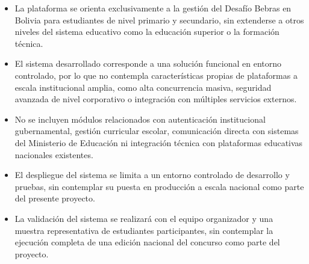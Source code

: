     \begin{itemize}
        \item La plataforma se orienta exclusivamente a la gestión del Desafío Bebras en Bolivia para estudiantes de nivel primario y secundario, sin extenderse a otros niveles del sistema educativo como la educación superior o la formación técnica.

        \item El sistema desarrollado corresponde a una solución funcional en entorno controlado, por lo que no contempla características propias de plataformas a escala institucional amplia, como alta concurrencia masiva, seguridad avanzada de nivel corporativo o integración con múltiples servicios externos.

        \item No se incluyen módulos relacionados con autenticación institucional gubernamental, gestión curricular escolar, comunicación directa con sistemas del Ministerio de Educación ni integración técnica con plataformas educativas nacionales existentes.

        \item El despliegue del sistema se limita a un entorno controlado de desarrollo y pruebas, sin contemplar su puesta en producción a escala nacional como parte del presente proyecto.

        \item La validación del sistema se realizará con el equipo organizador y una muestra representativa de estudiantes participantes, sin contemplar la ejecución completa de una edición nacional del concurso como parte del proyecto.
    \end{itemize}
